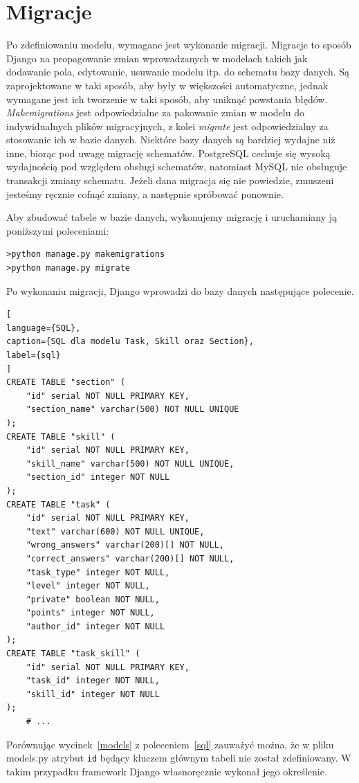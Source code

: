 \documentclass[oneside,polski,logo,indent]{amuthesis}
\begin{document}
\section{Migracje}
Po zdefiniowaniu modelu, wymagane jest wykonanie migracji. Migracje to sposób Django na propagowanie zmian wprowadzanych w modelach takich jak dodawanie pola, edytowanie, usuwanie modelu itp. do schematu bazy danych. Są zaprojektowane w taki sposób, aby były w większości automatyczne, jednak wymagane jest ich tworzenie w taki sposób, aby uniknąć powstania błędów. \emph{Makemigrations} jest odpowiedzialne za pakowanie zmian w modelu do indywidualnych plików migracyjnych, z kolei \emph{migrate} jest odpowiedzialny za stosowanie ich w bazie danych.
Niektóre bazy danych są bardziej wydajne niż inne, biorąc pod uwagę migrację schematów. PostgreSQL cechuje się wysoką wydajnością pod względem obsługi schematów, natomiast MySQL nie obsługuje transakcji zmiany schematu. Jeżeli dana migracja się nie powiedzie, zmuszeni jesteśmy ręcznie cofnąć zmiany, a następnie spróbować ponownie. 

Aby zbudować tabele w bazie danych, wykonujemy migrację i uruchamiany ją poniższymi poleceniami: 

\begin{lstlisting}[style=DOS]
>python manage.py makemigrations
>python manage.py migrate
\end{lstlisting}
Po wykonaniu migracji, Django wprowadzi do bazy danych następujące polecenie.
\begin{lstlisting}[
language={SQL},
caption={SQL dla modelu Task, Skill oraz Section},
label={sql}
]
CREATE TABLE "section" (
	"id" serial NOT NULL PRIMARY KEY, 
	"section_name" varchar(500) NOT NULL UNIQUE
);
CREATE TABLE "skill" (
	"id" serial NOT NULL PRIMARY KEY, 
	"skill_name" varchar(500) NOT NULL UNIQUE, 
	"section_id" integer NOT NULL
);
CREATE TABLE "task" (
	"id" serial NOT NULL PRIMARY KEY, 
	"text" varchar(600) NOT NULL UNIQUE, 
	"wrong_answers" varchar(200)[] NOT NULL, 
	"correct_answers" varchar(200)[] NOT NULL,
	"task_type" integer NOT NULL, 
	"level" integer NOT NULL, 
	"private" boolean NOT NULL, 
	"points" integer NOT NULL, 
	"author_id" integer NOT NULL
);
CREATE TABLE "task_skill" (
	"id" serial NOT NULL PRIMARY KEY, 
	"task_id" integer NOT NULL, 
	"skill_id" integer NOT NULL
);
	# ...
\end{lstlisting}

Porównując wycinek~\ref{models} z poleceniem~\ref{sql} zauważyć można, że w pliku models.py atrybut \texttt{id} będący kluczem głównym tabeli nie został zdefiniowany. W takim przypadku framework Django własnoręcznie wykonał jego określenie.
\end{document}
